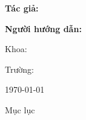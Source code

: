 
\begin{frame}
    \titlepage
\end{frame}

\begin{frame}
    \centering
    {\Large \textbf{Tác giả:} \TENTACGIA \par}
    {\Large \textbf{Người hướng dẫn:} \TENNGUOIHUONGDAN \par}
    \vspace{0.5cm}
    {\small Khoa: \KHOA \par}
    {\small Trường: \TRUONG \par}
    \vfill
    {\footnotesize \today}
\end{frame}

\begin{frame}{Mục lục}
    \tableofcontents
\end{frame}
